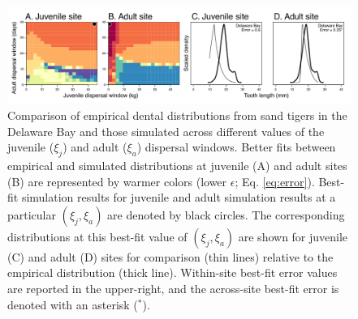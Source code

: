 \documentclass[]{rsos}%
\begin{document}
\begin{figure}[ht]
  \centering
  \includegraphics[width=1\linewidth]{fig_empirical_comp_Delaware2.pdf}  

\caption{Comparison of empirical dental distributions from sand tigers in the Delaware Bay and those simulated across different values of the juvenile ($\xi_j$) and adult ($\xi_a$) dispersal windows.
Better fits between empirical and simulated distributions at juvenile (A) and adult sites (B) are represented by warmer colors (lower $\epsilon$; Eq. \ref{eq:error}). 
Best-fit simulation results for juvenile and adult simulation results at a particular $(\xi_j,\xi_a)$ are denoted by black circles.
The corresponding distributions at this best-fit value of $(\xi_j,\xi_a)$ are shown for juvenile (C) and adult (D) sites for comparison (thin lines) relative to the empirical distribution (thick line). 
Within-site best-fit error values are reported in the upper-right, and the across-site best-fit error is denoted with an asterisk (${}^\ast$).
}
\label{fig:compmodern}
\end{figure}
\end{document}
